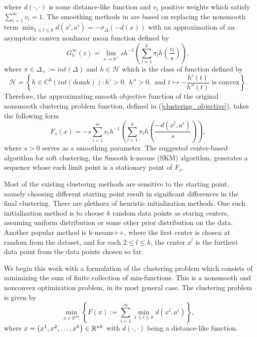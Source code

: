	where $d(\cdot,\cdot)$ is some distance-like function and $v_i$ positive weights which satisfy $\sum_{i=1}^m v_i=1$. The smoothing methods in \cite{T2007} are based on replacing the nonsmooth term $\min_{1\leq l \leq k} d\left(x^l,a^i\right) = -\sigma_{\Delta}(-d(x))$ with an approximation of an asymptotic convex nonlinear mean function defined by
	\begin{equation*}
		G^{\infty}_h(z) = \lim\limits_{s\rightarrow 0^+} sh^{-1} \left(\sum\limits_{l=1}^k \pi_l h\left(\frac{z_l}{s} \right) \right),
	\end{equation*}
	where $\pi \in \Delta_+:=int\left(\Delta\right)$ and $h \in \mathcal{H}$ which is the class of function defined by
	\begin{equation*}
		\mathcal{H} = \left\lbrace h \in C^3(int(\text{dom}h)) : h'>0, \; h''>0, \text{ and } t\mapsto -\frac{h'(t)}{h''(t)} \text{ is convex}\right\rbrace.
	\end{equation*}
	 Therefore, the approximating smooth objective function of the original nonsmooth clustering problem function, defined in (\ref{clustering_objective}), takes the following form
	\begin{equation*}
		F_s(x) = -s\sum\limits_{i=1}^m v_i h^{-1} \left(\sum\limits_{l=1}^k \pi_l h\left(\frac{-d\left(x^l,a^i\right)}{s} \right) \right),
	\end{equation*}
	where $s>0$ serves as a smoothing parameter. The suggested center-based algorithm for soft clustering, the Smooth k-means (SKM) algorithm, generates a sequence whose each limit point is a stationary point of $F_s$.\medskip

Most of the existing clustering methods are sensitive to the starting point, namely choosing different starting point result in significant differences in the final clustering. There are plethora of heuristic initialization methods. One such initialization method is to choose $k$ random data points as staring centers, assuming uniform distribution or some other prior distribution on the data. Another popular method is k-means++, where the first center is chosen at random from the dataset, and for each $2 \leq l \leq k$, the center $x^l$ is the furthest data point from the data points chosen so far. \medskip

We begin this work with a formulation of the clustering problem which consists of minimizing the sum of finite collection of min-functions. This is a nonsmooth and nonconvex optimization problem, in its most general case. The clustering problem is given by
\begin{equation}
	\min\limits_{x \in \mathbb{R}^{nk}} \left\lbrace F(x) := \sum\limits_{i=1}^{m} \min\limits_{1 \le l \le k} d(x^l,a^i) \right\rbrace , \label{StateEq1}
\end{equation}
where $x=\left( x^1,x^2, \ldots, x^k \right) \in \mathbb{R}^{nk}$ with $\textit{d}(\cdot ,\cdot)$ being a distance-like function. \medskip

